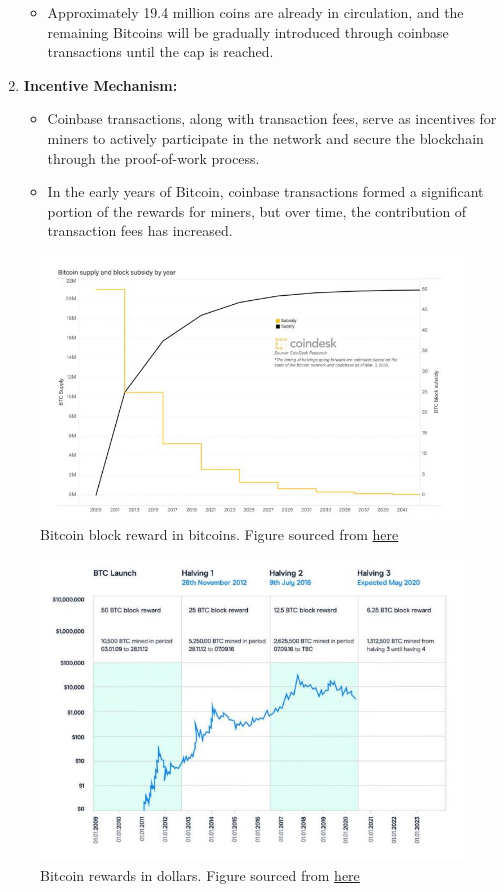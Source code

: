 \begin{enumerate}
\begin{itemize}
        \item Approximately 19.4 million coins are already in circulation, and the remaining Bitcoins will be gradually introduced through coinbase transactions until the cap is reached.
    \end{itemize}
    \item \textbf{Incentive Mechanism:}
    \begin{itemize}
        \item Coinbase transactions, along with transaction fees, serve as incentives for miners to actively participate in the network and secure the blockchain through the proof-of-work process.
        \item In the early years of Bitcoin, coinbase transactions formed a significant portion of the rewards for miners, but over time, the contribution of transaction fees has increased.
    \end{itemize}
\end{enumerate}
\begin{figure}[h!]
    \centering
    \includegraphics[width=0.6\linewidth]{Fig/05/F1}
    \caption{Bitcoin block reward in bitcoins. Figure sourced from  \href{https://www.coindesk.com/bitcoin-halving-explainer}{here}}
    \label{fig:f1}
\end{figure}

\begin{figure}[h!]
    \centering
    \includegraphics[width=0.6\linewidth]{Fig/05/F2}
    \caption{Bitcoin rewards in dollars. Figure sourced from  \href{https://www.cmcmarkets.com/en/learn-cryptocurrencies/bitcoin-halving}{here}}
    \label{fig:f2}
\end{figure}

